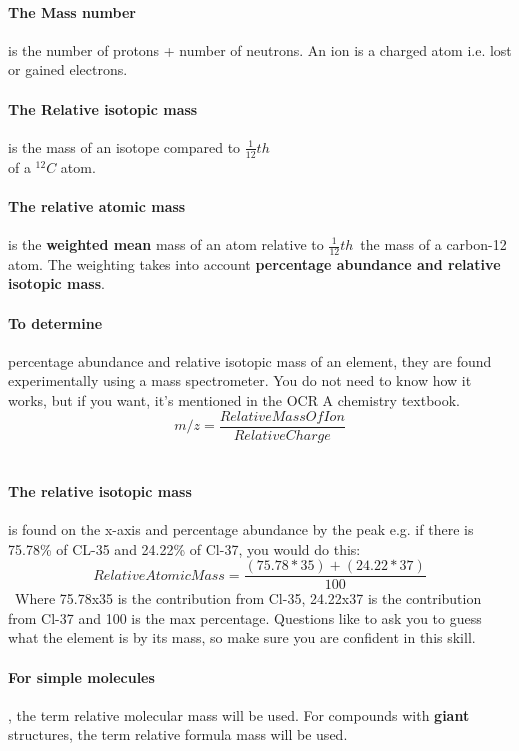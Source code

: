 \paragraph{The Mass number} is the number of protons + number of neutrons. 
An ion is a charged atom i.e. lost or gained electrons.
\paragraph{The Relative isotopic mass}is the mass of an isotope compared to \(\frac{1}{12}th\)\\ of a $^{12}C$ atom. 
\paragraph{The relative atomic mass}is the \textbf{weighted mean} mass of an atom relative to  \(\frac{1}{12}th\)\ the mass of a carbon-12 atom. The weighting takes into account \textbf{percentage abundance and relative isotopic mass}. 

\paragraph{To determine} percentage abundance and relative isotopic mass of an element, they are found experimentally using a mass spectrometer. You do not need to know how it works, but if you want, it's mentioned in the OCR A chemistry textbook.
\[m/z= \frac{Relative Mass Of Ion}{Relative Charge}\]\
\paragraph{The relative isotopic mass} is found on the x-axis and percentage abundance by the peak e.g. if there is 75.78\% of CL-35 and 24.22\% of Cl-37, you would do this:
\[Relative Atomic Mass=\frac{(75.78*35)+(24.22*37)}{100}\]\
Where 75.78x35 is the contribution from Cl-35, 24.22x37 is the contribution from Cl-37 and 100 is the max percentage. Questions like to ask you to guess what the element is by its mass, so make sure you are confident in this skill. 
\paragraph{For simple molecules}, the term relative molecular mass will be used.
For compounds with \textbf{giant} structures, the term relative formula mass will be used.
